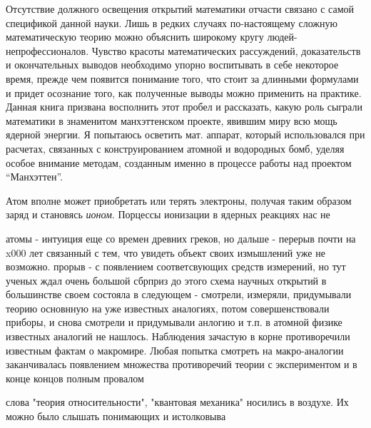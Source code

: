 Отсутствие должного освещения открытий математики отчасти связано с самой спецификой данной науки. Лишь в редких случаях по-настоящему сложную математическую теорию можно объяснить широкому кругу людей-непрофессионалов. Чувство красоты математических рассуждений, доказательств и окончательных выводов необходимо упорно воспитывать в себе некоторое время, прежде чем появится понимание того, что стоит за длинными формулами и придет осознание того, как полученные выводы можно применить на практике.
Данная книга призвана восполнить этот пробел и рассказать, какую роль сыграли математики в знаменитом манхэттенском проекте, явившим миру всю мощь ядерной энергии. Я попытаюсь осветить мат. аппарат, который использовался при расчетах, связанных с конструированием атомной и водородных бомб, уделяя особое внимание методам, созданным именно в процессе работы над проектом “Манхэттен”.






Атом вполне может приобретать или терять электроны, получая таким образом заряд и становясь \textit{ионом}.
Порцессы ионизации в ядерных реакциях нас не 



атомы - интуиция еще со времен древних греков, но дальше - перерыв почти на x000 лет связанный с тем, что увидеть объект своих измышлений уже не возможно.
прорыв - с появлением соответсвующих средств измерений, но тут ученых ждал очень большой сбрприз
до этого схема научных открытий в большинстве своем состояла в следующем - смотрели, измеряли, придумывали теорию основнную на уже известных аналогиях, потом совершенствовали приборы, и снова смотрели и придумывали анлогию и т.п.
в атомной физике известных аналогий не нашлось. Наблюдения зачастую в корне противоречили известным фактам о макромире. Любая попытка смотреть на макро-аналогии заканчивалась появлением множества противоречий теории с экспериментом и в конце концов полным провалом 




 
слова "теория относительности", "квантовая механика" носились в воздухе. Их можно было слышать  понимающих и истолковыва



